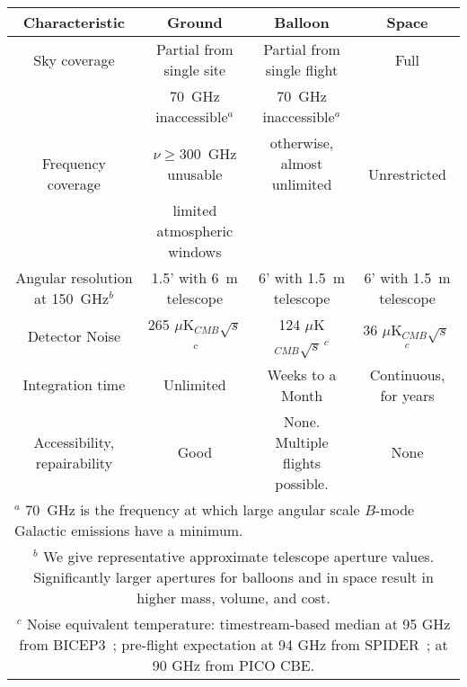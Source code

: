 \documentclass[PICOReport.tex]{subfiles}
\begin{document}
\newcommand{\sizeA}{0.09\textwidth} %
\begin{table}%
\begin{adjustbox}{width=1.2\textwidth,center}
\begin{tabular}{|c|@{\hspace{\sizeA}}c@{\hspace{\sizeA}}|@{\hspace{\sizeA}}c@{\hspace{\sizeA}}|c|}
\hline
\bf{Characteristic} & {\bf Ground} & {\bf Balloon} & {\bf Space}  \\ \hline
Sky coverage & Partial from single site & Partial from single flight & Full \\ \hline
\multirow{3}{*}{Frequency coverage} & 70~GHz inaccessible$^{a}$    & 70~GHz inaccessible$^{a}$       & \multirow{3}{*}{Unrestricted} \\  
                                                           &  $\nu \ge 300$~GHz unusable   &    otherwise, almost unlimited   &                                            \\  
                                                           &     limited atmospheric windows  &                                      &                                           \\ \hline
  Angular resolution at 150~GHz$^{b}$  & 1.5' with 6~m telescope & 6' with 1.5~m telescope & 6' with 1.5~m telescope \\ \hline
   Detector Noise                                    & 265 $\mu$K$_{CMB} \sqrt{s}$\,$^{c}$  & 124 $\mu$K$_{CMB} \sqrt{s}$\,$^{c}$ &  36 $\mu$K$_{CMB} \sqrt{s}$\,$^{c}$ \\  \hline
Integration time                                   & Unlimited & Weeks to a Month & Continuous, for years \\ \hline
Accessibility, repairability                    & Good & None.  Multiple flights possible.& None \\
\hline
\multicolumn{4}{l}{$^{a}$ 70~GHz is the frequency at which large angular scale $B$-mode Galactic emissions have a minimum. } \\
\multicolumn{4}{p{1.7\linewidth}}{$^{b}$ We give representative approximate telescope aperture values. Significantly larger apertures for balloons and in space result in higher mass, volume, and cost.  }\\
\multicolumn{4}{p{1.8\linewidth}}{$^{c}$ Noise equivalent temperature: timestream-based median at 95 GHz from BICEP3~\citep{kang20182017}; pre-flight expectation at 94 GHz from SPIDER~\citep{2014SPIE.9153E..13R}; at 90 GHz from PICO CBE.} \\


\end{tabular}
\end{adjustbox}
\end{table}
\end{document}
